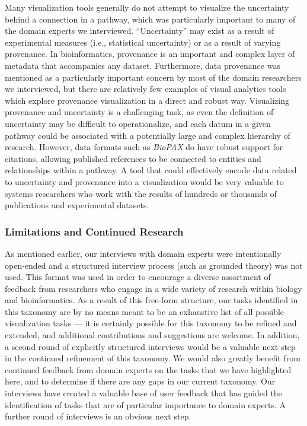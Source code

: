 \documentclass[twocolumn]{bmcart}%
\begin{document}
Many visualization tools generally do not attempt to visualize the uncertainty behind a connection in a pathway, which was particularly important to many of the domain experts we interviewed.
``Uncertainty'' may exist as a result of experimental measures (i.e., statistical uncertainty) or as a result of varying provenance.
In bioinformatics, provenance is an important and complex layer of metadata that accompanies any dataset.
Furthermore, data provenance was mentioned as a particularly important concern by most of the domain researchers we interviewed, but there are relatively few examples of visual analytics tools which explore provenance visualization in a direct and robust way.
Visualizing provenance and uncertainty is a challenging task, as even the definition of uncertainty may be difficult to operationalize, and each datum in a given pathway could be associated with a potentially large and complex hierarchy of research.
However, data formats such as \emph{BioPAX} do have robust support for citations, allowing published references to be connected to entities and relationships within a pathway.
A tool that could effectively encode data related to uncertainty and provenance into a visualization would be very valuable to systems researchers who work with the results of hundreds or thousands of publications and experimental datasets.

\subsubsection*{Limitations and Continued Research}

As mentioned earlier, our interviews with domain experts were intentionally open-ended and a structured interview process (such as grounded theory) was not used.
This format was used in order to encourage a diverse assortment of feedback from researchers who engage in a wide variety of research within biology and bioinformatics.
As a result of this free-form structure, our tasks identified in this taxonomy are by no means meant to be an exhaustive list of all possible visualization tasks --- it is certainly possible for this taxonomy to be refined and extended, and additional contributions and suggestions are welcome.
In addition, a second round of explicitly structured interviews would be a valuable next step in the continued refinement of this taxonomy.
We would also greatly benefit from continued feedback from domain experts on the tasks that we have highlighted here, and to determine if there are any gaps in our current taxonomy.
Our interviews have created a valuable base of user feedback that has guided the identification of tasks that are of particular importance to domain experts.
A further round of interviews is an obvious next step.
\end{document}

